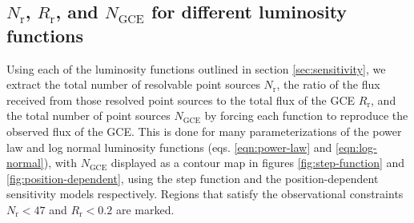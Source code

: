 \documentclass[a4paper,11pt]{article}
\begin{document}
\subsection{$N_\text{r}$, $R_\text{r}$, and $N_\text{GCE}$ for different luminosity functions}
Using each of the luminosity functions outlined in section \ref{sec:sensitivity}, we extract the total number of resolvable point sources $N_\text{r}$, the ratio of the flux received from those resolved point sources to the total flux of the GCE $R_\text{r}$, and the total number of point sources $N_\text{GCE}$ by forcing each function to reproduce the observed flux of the GCE. This is done for many parameterizations of the power law and log normal luminosity functions (eqs. \ref{eqn:power-law} and \ref{eqn:log-normal}), with $N_\text{GCE}$ displayed as a contour map in figures \ref{fig:step-function} and \ref{fig:position-dependent}, using the step function and the position-dependent sensitivity models respectively. Regions that satisfy the observational constraints $N_\text{r} < 47$ and $R_\text{r} < 0.2$ are marked.
\end{document}
